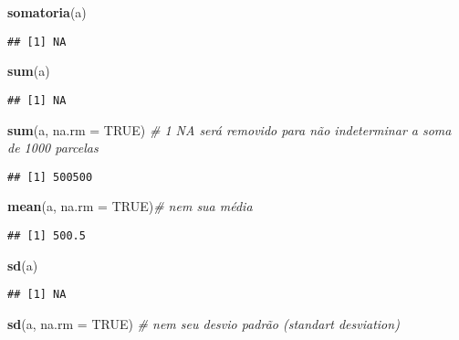 \documentclass[]{article}
\newenvironment{Shaded}{\begin{snugshade}}{\end{snugshade}}
\newcommand{\KeywordTok}[1]{\textcolor[rgb]{0.13,0.29,0.53}{\textbf{#1}}}
\newcommand{\DataTypeTok}[1]{\textcolor[rgb]{0.13,0.29,0.53}{#1}}
\newcommand{\CommentTok}[1]{\textcolor[rgb]{0.56,0.35,0.01}{\textit{#1}}}
\newcommand{\OtherTok}[1]{\textcolor[rgb]{0.56,0.35,0.01}{#1}}
\newcommand{\NormalTok}[1]{#1}
\begin{document}
\begin{Shaded}
\begin{Highlighting}[]
\KeywordTok{somatoria}\NormalTok{(a)}
\end{Highlighting}
\end{Shaded}

\begin{verbatim}
## [1] NA
\end{verbatim}

\begin{Shaded}
\begin{Highlighting}[]
\KeywordTok{sum}\NormalTok{(a)}
\end{Highlighting}
\end{Shaded}

\begin{verbatim}
## [1] NA
\end{verbatim}

\begin{Shaded}
\begin{Highlighting}[]
\KeywordTok{sum}\NormalTok{(a, }\DataTypeTok{na.rm =} \OtherTok{TRUE}\NormalTok{) }\CommentTok{# 1 NA será removido para não indeterminar a soma de 1000 parcelas}
\end{Highlighting}
\end{Shaded}

\begin{verbatim}
## [1] 500500
\end{verbatim}

\begin{Shaded}
\begin{Highlighting}[]
\KeywordTok{mean}\NormalTok{(a, }\DataTypeTok{na.rm =} \OtherTok{TRUE}\NormalTok{)}\CommentTok{# nem sua média}
\end{Highlighting}
\end{Shaded}

\begin{verbatim}
## [1] 500.5
\end{verbatim}

\begin{Shaded}
\begin{Highlighting}[]
\KeywordTok{sd}\NormalTok{(a)}
\end{Highlighting}
\end{Shaded}

\begin{verbatim}
## [1] NA
\end{verbatim}

\begin{Shaded}
\begin{Highlighting}[]
\KeywordTok{sd}\NormalTok{(a, }\DataTypeTok{na.rm =} \OtherTok{TRUE}\NormalTok{)  }\CommentTok{# nem seu desvio padrão (standart desviation)}
\end{Highlighting}
\end{Shaded}
\end{document}
